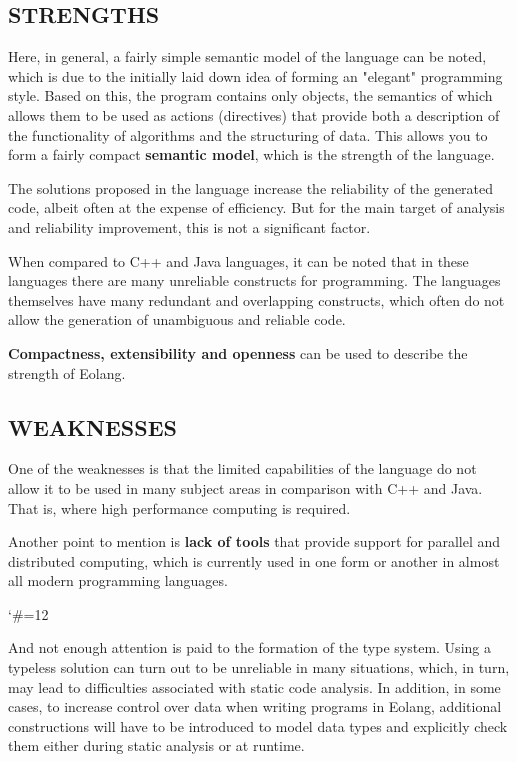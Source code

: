 \documentclass[12pt]{book}
\begin{document}
{{\subsection{STRENGTHS}
Here, in general, a fairly simple semantic model of the language can be noted, which is due to the initially laid down idea of forming an "elegant" programming style. Based on this, the program contains only objects, the semantics of which allows them to be used as actions (directives) that provide both a description of the functionality of algorithms and the structuring of data. This allows you to form a fairly compact \textbf{semantic model}, which is the strength of the language.

The solutions proposed in the language increase the reliability of the generated code, albeit often at the expense of efficiency. But for the main target of analysis and reliability improvement, this is not a significant factor.

When compared to C++ and Java languages, it can be noted that in these languages there are many unreliable constructs for programming. The languages themselves have many redundant and overlapping constructs, which often do not allow the generation of unambiguous and reliable code.

\textbf{Compactness, extensibility and openness } can be used to describe the strength of Eolang.


\subsection{WEAKNESSES}
One of the weaknesses is that the limited capabilities of the language do not allow it to be used in many subject areas in comparison with C++ and Java. That is, where high performance computing is required.

Another point to mention is \textbf{lack of tools} that provide support for parallel and distributed computing, which is currently used in one form or another in almost all modern programming languages.

\catcode`\#=12\relax
{}


And not enough attention is paid to the formation of the type system. Using a typeless solution can turn out to be unreliable in many situations, which, in turn, may lead to difficulties associated with static code analysis. In addition, in some cases, to increase control over data when writing programs in Eolang, additional constructions will have to be introduced to model data types and explicitly check them either during static analysis or at runtime.

}}
\end{document}
